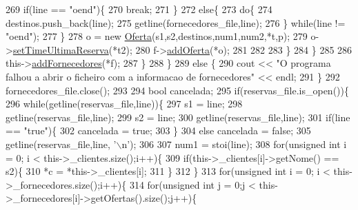 \begin{DoxyCode}
269                         \textcolor{keywordflow}{if}(line == \textcolor{stringliteral}{"oend"})\{
270                             \textcolor{keywordflow}{break};
271                         \}
272                         \textcolor{keywordflow}{else}\{
273                             \textcolor{keywordflow}{do}\{
274                                 destinos.push\_back(line);
275                                 getline(fornecedores\_file,line);
276                             \} \textcolor{keywordflow}{while}(line != \textcolor{stringliteral}{"oend"});
277                         \}
278                         o = \textcolor{keyword}{new} \hyperlink{classOferta}{Oferta}(s1,s2,destinos,num1,num2,*t,p);
279                         o->\hyperlink{classOferta_a50c041d2301a351f2ac69ed235175116}{setTimeUltimaReserva}(*t2);
280                         f->\hyperlink{classFornecedor_a220373fd19f44a30d7c6c1ec913be700}{addOferta}(*o);
281 
282 
283                     \}
284                 \}
285 
286                 this->\hyperlink{classEmpresa_a0c858479d6e92094adbb2fc085039376}{addFornecedores}(*f);
287             \}
288     \}
289         \textcolor{keywordflow}{else} \{
290             cout << \textcolor{stringliteral}{"O programa falhou a abrir o ficheiro com a informacao de fornecedores"} << endl;
291         \}
292     fornecedores\_file.close();
293 
294     \textcolor{keywordtype}{bool} cancelada;
295     \textcolor{keywordflow}{if}(reservas\_file.is\_open())\{
296         \textcolor{keywordflow}{while}(getline(reservas\_file,line))\{
297             s1 = line;
298             getline(reservas\_file,line);
299             s2 = line;
300             getline(reservas\_file,line);
301             \textcolor{keywordflow}{if}(line == \textcolor{stringliteral}{"true"})\{
302                 cancelada = \textcolor{keyword}{true};
303             \}
304             \textcolor{keywordflow}{else} cancelada = \textcolor{keyword}{false};
305             getline(reservas\_file,line, \textcolor{charliteral}{'\(\backslash\)n'});
306 
307             num1 = stoi(line);
308             \textcolor{keywordflow}{for}(\textcolor{keywordtype}{unsigned} \textcolor{keywordtype}{int} i = 0; i < this->\_clientes.size();i++)\{
309                 \textcolor{keywordflow}{if}(this->\_clientes[i]->getNome() == s2)\{
310                     *c = *this->\_clientes[i];
311                 \}
312             \}
313             \textcolor{keywordflow}{for}(\textcolor{keywordtype}{unsigned} \textcolor{keywordtype}{int} i = 0; i < this->\_fornecedores.size();i++)\{
314                             \textcolor{keywordflow}{for}(\textcolor{keywordtype}{unsigned} \textcolor{keywordtype}{int} j = 0;j < this->\_fornecedores[i]->getOfertas().size();j++)\{

\end{DoxyCode}
